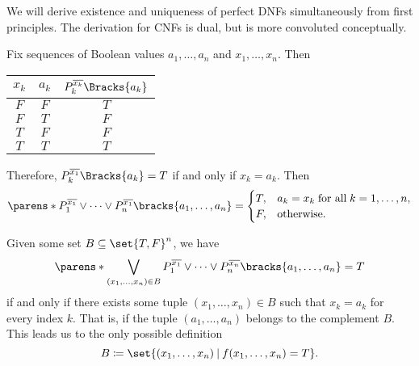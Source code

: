 \begin{defproof}
  We will derive existence and uniqueness of perfect DNFs simultaneously from first principles. The derivation for CNFs is dual, but is more convoluted conceptually.

  Fix sequences of Boolean values \( a_1, \ldots, a_n \) and \( x_1, \ldots, x_n \). Then
  \begin{center}
    \begin{tabular}{c c | c}
      \( x_k \) & \( a_k \) & \( P_k^{\overline{x_k}}\Bracks{a_k} \) \\
      \hline
      \( F \)   & \( F \)   & \( T \) \\
      \( F \)   & \( T \)   & \( F \) \\
      \( T \)   & \( F \)   & \( F \) \\
      \( T \)   & \( T \)   & \( T \)
    \end{tabular}
  \end{center}

  Therefore, \( P_k^{\overline{x_1}}\Bracks{a_k} = T \) if and only if \( x_k = a_k \). Then
  \begin{equation*}
    \parens*{ P_1^{\overline{x_1}} \vee \cdots \vee P_n^{\overline{x_1}} }\bracks{ a_1, \ldots, a_n }
    =
    \begin{cases}
      T, &a_k = x_k \T{for all} k = 1, \ldots, n, \\
      F, &\T{otherwise.}
    \end{cases}
  \end{equation*}

  Given some set \( B \subseteq \set{ T, F }^n \), we have
  \begin{equation*}
    \parens*{ \bigvee_{(x_1, \ldots, x_n) \in B} P_1^{\overline{x_1}} \vee \cdots \vee P_n^{\overline{x_n}} }\bracks{ a_1, \ldots, a_n } = T
  \end{equation*}
  if and only if there exists some tuple \( (x_1, \ldots, x_n) \in B \) such that \( x_k = a_k \) for every index \( k \). That is, if the tuple \( (a_1, \ldots, a_n) \) belongs to the complement \( B \). This leads us to the only possible definition
  \begin{equation*}
    B \coloneqq \set{ (x_1, \ldots, x_n) \given f(x_1, \ldots, x_n) = T }.
  \end{equation*}
\end{defproof}

